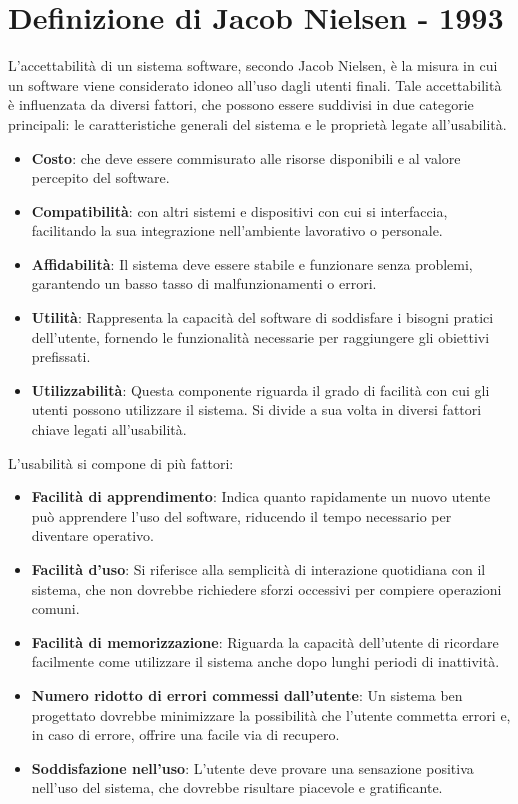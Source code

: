 \documentclass{report}
\begin{document}
	\section{Definizione di Jacob Nielsen - 1993}
	L'accettabilità di un sistema software, secondo Jacob Nielsen, è la misura in cui un software viene considerato idoneo all'uso dagli utenti finali. Tale accettabilità è influenzata da diversi fattori, che possono essere suddivisi in due categorie principali: le caratteristiche generali del sistema e le proprietà legate all'usabilità.
	\begin{itemize}
		\item \textbf{Costo}: che deve essere commisurato alle risorse disponibili e al valore percepito del software.
		\item \textbf{Compatibilità}: con altri sistemi e dispositivi con cui si interfaccia, facilitando la sua integrazione nell'ambiente lavorativo o personale.
		\item \textbf{Affidabilità}: Il sistema deve essere stabile e funzionare senza problemi, garantendo un basso tasso di malfunzionamenti o errori.
		\item \textbf{Utilità}: Rappresenta la capacità del software di soddisfare i bisogni pratici dell'utente, fornendo le funzionalità necessarie per raggiungere gli obiettivi prefissati.
		\item \textbf{Utilizzabilità}: Questa componente riguarda il grado di facilità con cui gli utenti possono utilizzare il sistema. Si divide a sua volta in diversi fattori chiave legati all'usabilità.
	\end{itemize}
	L'usabilità si compone di più fattori:
	\begin{itemize}
		\item \textbf{Facilità di apprendimento}: Indica quanto rapidamente un nuovo utente può apprendere l'uso del software, riducendo il tempo necessario per diventare operativo.
		\item \textbf{Facilità d'uso}: Si riferisce alla semplicità di interazione quotidiana con il sistema, che non dovrebbe richiedere sforzi occessivi per compiere operazioni comuni.
		\item \textbf{Facilità di memorizzazione}: Riguarda la capacità dell'utente di ricordare facilmente come utilizzare il sistema anche dopo lunghi periodi di inattività.
		\item \textbf{Numero ridotto di errori commessi dall'utente}: Un sistema ben progettato dovrebbe minimizzare la possibilità che l'utente commetta errori e, in caso di errore, offrire una facile via di recupero.
		\item \textbf{Soddisfazione nell'uso}: L'utente deve provare una sensazione positiva nell'uso del sistema, che dovrebbe risultare piacevole e gratificante.
	\end{itemize}
\end{document}

